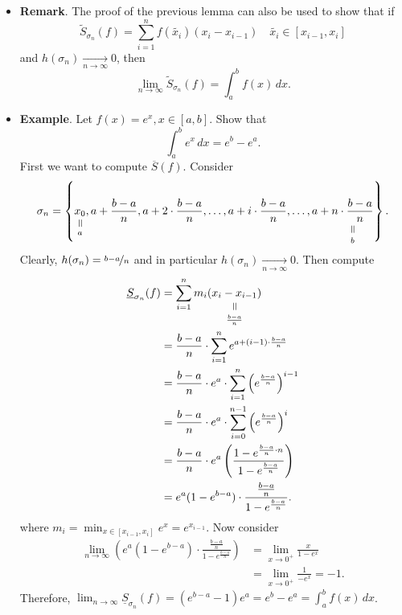 \documentclass{article}
\newcommand{\verteq}{\rotatebox{90}{$\,=$}}
\newcommand{\equalto}[2]{\underset{\scriptstyle\overset{\mkern4mu\verteq}{#2}}{#1}}
\newcommand{\?}{\stackrel{?}{=}}
\theoremstyle{definition} %
\begin{document}
\begin{itemize}
\begin{proof}
        i.e.,
        $$\lim_{n \to \infty} \overline{S}_{\sigma_n}(f) = \overline{S}(f) \quad \text{and} \lim_{n \to \infty} \underline{S}_{\sigma_n}(f) = \underline{S}(f).$$
    \end{proof}
    \item \textbf{Remark}. The proof of the previous lemma can also be used to show that if
    $$\widetilde{S}_{\sigma_n}(f) = \sum_{i = 1}^n f(\widetilde{x_i})(x_i - x_{i - 1}) \quad \widetilde{x_i} \in [x_{i - 1}, x_i]$$
    and $h(\sigma_n) \underset{n \rightarrow \infty}{\longrightarrow} 0$, then
    $$\lim_{n \to \infty} \widetilde{S}_{\sigma_n}(f) = \int_a^b f(x) \, dx.$$
    \item \textbf{Example}. Let $f(x) = e^x, x \in [a, b]$. Show that
    $$\int_a^b e^x \, dx = e^b - e^a.$$
    First we want to compute $\overline{S}(f)$. Consider
    $$\sigma_n = \left\{\equalto{x_0}{a}, a + \frac{b - a}{n}, a + 2 \cdot \frac{b - a}{n}, \ldots, a + i \cdot \frac{b - a}{n}, \ldots, a + \equalto{n \cdot \frac{b - a}{n}}{b}\right\}.$$
    Clearly, $h(\sigma_n) = \nicefrac{b - a}{n}$ and in particular $h(\sigma_n) \underset{n \rightarrow \infty}{\longrightarrow} 0$. Then compute
    \begin{align*}
        \underline{S}_{\sigma_n}(f) &= \sum_{i = 1}^n m_i\equalto{(x_i - x_{i - 1})}{\frac{b - a}{n}} \\
        &= \frac{b - a}{n} \cdot \sum_{i = 1}^n e^{a + (i - 1) \cdot \frac{b - a}{n}} \\
        &= \frac{b - a}{n} \cdot e^a \cdot  \sum_{i = 1}^{n}\left(e^{\frac{b - a}{n}}\right)^{i - 1} \\
        &= \frac{b - a}{n} \cdot e^a \cdot \sum_{i = 0}^{n - 1} \left(e^{\frac{b - a}{n}}\right)^i \\
        &= \frac{b - a}{n} \cdot e^a \left(\frac{1 - e^{\frac{b - a}{n} \cdot n}}{1 - e^{\frac{b - a}{n}}}\right) \\
        &= e^a(1 - e^{b - a}) \cdot \frac{\frac{b - a}{n}}{1 - e^{\frac{b - a}{n}}}.
    \end{align*}
    where $m_i = \min_{x \in [x_{i - 1}, x_i]} e^x = e^{x_{i - 1}}$. Now consider
    \begin{align*}
        \lim_{n \to \infty} \left(e^a(1 - e^{b - a}) \cdot \frac{\frac{b - a}{n}}{1 - e^{\frac{b - a}{n}}}\right) &= \lim_{x \to 0^+} \frac{x}{1 - e^x} \\
        &= \lim_{x \to 0^+} \frac{1}{-e^x} = -1.
    \end{align*}
    Therefore, $\lim_{n \to \infty} \underline{S}_{\sigma_n}(f) = (e^{b - a} - 1)e^a = e^b - e^a = \int_a^b f(x) \, dx$.
\end{itemize}
\end{document}
